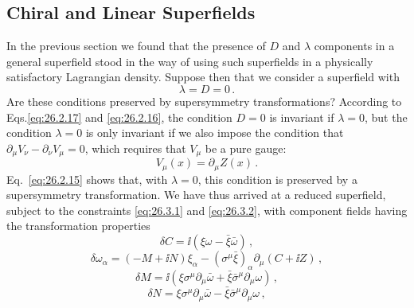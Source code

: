 
\subsection{Chiral and Linear Superfields}

In the previous section we found that the presence of $D$ and $\lambda$
components in a general superfield stood in the way of using such superfields
in a physically satisfactory Lagrangian density. Suppose then that we consider
a superfield with
\begin{equation}
  \lambda=D=0\,.
  \tag{26.3.1}\label{eq:26.3.1}
\end{equation}
Are these conditions preserved by supersymmetry transformations? According to
Eqs.\linebreak \eqref{eq:26.2.17} and \eqref{eq:26.2.16}, the condition $D=0$ is
invariant if $\lambda=0$, but the condition $\lambda=0$ is only invariant if
we also impose the condition that
$\partial_\mu V_\nu-\partial_\nu V_\mu=0$, which requires that $V_\mu$ be a
pure gauge:
\begin{equation}
  V_\mu(x)=\partial_\mu Z(x)\,.
  \tag{26.3.2}\label{eq:26.3.2}
\end{equation}
Eq.~\eqref{eq:26.2.15} shows that, with $\lambda=0$, this condition is
preserved by a supersymmetry transformation. We have thus arrived at a reduced
superfield, subject to the constraints \eqref{eq:26.3.1} and
\eqref{eq:26.3.2}, with component fields having the transformation properties
\begin{equation}
  \delta C=\ii(\xi\omega-\bar\xi\bar\omega)\,,
  \tag{26.3.3}\label{eq:26.3.3}
\end{equation}
\begin{equation}
  \delta\omega_\alpha
  =(-M+\ii N)\xi_\alpha
   -(\sigma^\mu\bar\xi)_\alpha\partial_\mu(C+\ii Z)\,,
  \tag{26.3.4}\label{eq:26.3.4}
\end{equation}
\begin{equation}
  \delta M=\ii\left(
    \xi\sigma^\mu\partial_\mu\bar\omega
    +\bar\xi\bar\sigma^\mu\partial_\mu\omega\right)\,,
  \tag{26.3.5}\label{eq:26.3.5}
\end{equation}
\begin{equation}
  \delta N=\xi\sigma^\mu\partial_\mu\bar\omega
  -\bar\xi\bar\sigma^\mu\partial_\mu\omega\,,
  \tag{26.3.6}\label{eq:26.3.6}
\end{equation}
